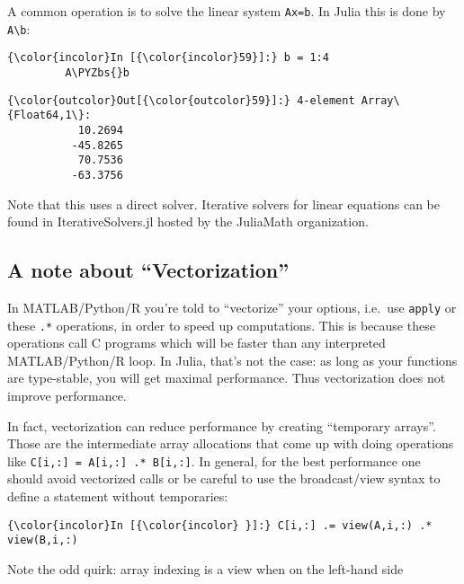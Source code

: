 \documentclass[11pt]{article}
\def\PYZbs{\char`\\}
\begin{document}
    A common operation is to solve the linear system \texttt{Ax=b}. In Julia
this is done by \texttt{A\textbackslash{}b}:

    \begin{Verbatim}[commandchars=\\\{\}]
{\color{incolor}In [{\color{incolor}59}]:} b = 1:4
         A\PYZbs{}b
\end{Verbatim}

            \begin{Verbatim}[commandchars=\\\{\}]
{\color{outcolor}Out[{\color{outcolor}59}]:} 4-element Array\{Float64,1\}:
           10.2694
          -45.8265
           70.7536
          -63.3756
\end{Verbatim}
        
    Note that this uses a direct solver. Iterative solvers for linear
equations can be found in IterativeSolvers.jl hosted by the JuliaMath
organization.

    \subsection{A note about
``Vectorization''}\label{a-note-about-vectorization}

In MATLAB/Python/R you're told to ``vectorize'' your options, i.e.~use
\texttt{apply} or these \texttt{.*} operations, in order to speed up
computations. This is because these operations call C programs which
will be faster than any interpreted MATLAB/Python/R loop. In Julia,
that's not the case: as long as your functions are type-stable, you will
get maximal performance. Thus vectorization does not improve
performance.

In fact, vectorization can reduce performance by creating ``temporary
arrays''. Those are the intermediate array allocations that come up with
doing operations like \texttt{C{[}i,:{]} = A{[}i,:{]} .* B{[}i,:{]}}. In
general, for the best performance one should avoid vectorized calls or
be careful to use the broadcast/view syntax to define a statement
without temporaries:

    \begin{Verbatim}[commandchars=\\\{\}]
{\color{incolor}In [{\color{incolor} }]:} C[i,:] .= view(A,i,:) .* view(B,i,:)
\end{Verbatim}

    Note the odd quirk: array indexing is a view when on the left-hand side
\end{document}
